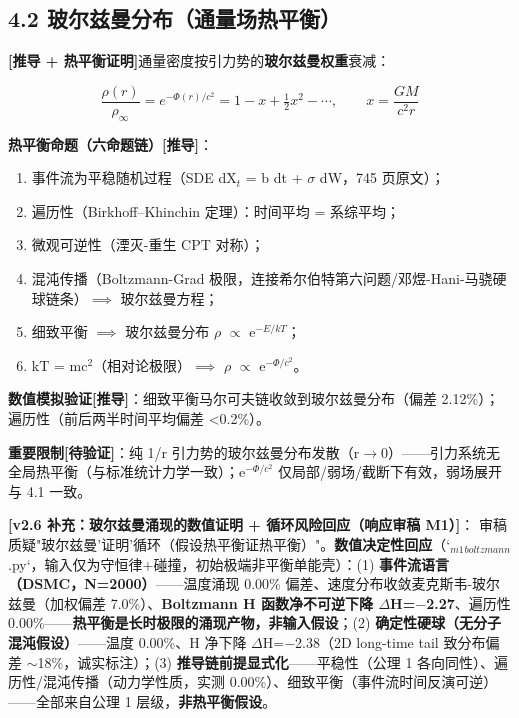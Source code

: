 \documentclass[12pt]{article}
\newcommand{\mtag}[1]{\textbf{[#1]}}
\newcommand{\up}[1]{\ensuremath{^{#1}}}
\newcommand{\down}[1]{\ensuremath{_{#1}}}
\begin{document}
\subsection{4.2 玻尔兹曼分布（通量场热平衡）}

\mtag{推导 + 热平衡证明}通量密度按引力势的\textbf{玻尔兹曼权重}衰减：

\[\frac{\rho(r)}{\rho_\infty} = e^{-\Phi(r)/c^2} = 1 - x + \tfrac12 x^2 - \cdots,\qquad x = \frac{GM}{c^2 r}\]

\textbf{热平衡命题（六命题链）}\mtag{推导}：
\begin{enumerate}
\item 事件流为平稳随机过程（SDE dX\down{t} = b dt + \ensuremath{\sigma} dW，745 页原文）；
\item 遍历性（Birkhoff--Khinchin 定理）：时间平均 = 系综平均；
\item 微观可逆性（湮灭-重生 CPT 对称）；
\item 混沌传播（Boltzmann-Grad 极限，连接希尔伯特第六问题/邓煜-Hani-马骁硬球链条）\ensuremath{\implies} 玻尔兹曼方程；
\item 细致平衡 \ensuremath{\implies} 玻尔兹曼分布 \ensuremath{\rho} \ensuremath{\propto} e\up{-E/kT}；
\item kT = mc\up{2}（相对论极限）\ensuremath{\implies} \ensuremath{\rho} \ensuremath{\propto} e\up{-\Phi{}/c^{2}}。
\end{enumerate}

\textbf{数值模拟验证}\mtag{推导}：细致平衡马尔可夫链收敛到玻尔兹曼分布（偏差 2.12\%）；遍历性（前后两半时间平均偏差 <0.2\%）。

\textbf{重要限制}\mtag{待验证}：纯 1/r 引力势的玻尔兹曼分布发散（r\ensuremath{\to}0）------引力系统无全局热平衡（与标准统计力学一致）；e\up{-\Phi{}/c^{2}} 仅局部/弱场/截断下有效，弱场展开与 4.1 一致。

\textbf{\mtag{v2.6 补充：玻尔兹曼涌现的数值证明 + 循环风险回应（响应审稿 M1）}}：
审稿质疑"玻尔兹曼'证明'循环（假设热平衡证热平衡）"。\textbf{数值决定性回应}（`\down{m1}\down{boltzmann}.py`，输入仅为守恒律+碰撞，初始极端非平衡单能壳）：(1) \textbf{事件流语言（DSMC，N=2000）}------温度涌现 0.00\% 偏差、速度分布收敛麦克斯韦-玻尔兹曼（加权偏差 7.0\%）、\textbf{Boltzmann H 函数净不可逆下降 \ensuremath{\Delta}H=\ensuremath{-}2.27}、遍历性 0.00\%------\textbf{热平衡是长时极限的涌现产物，非输入假设}；(2) \textbf{确定性硬球（无分子混沌假设）}------温度 0.00\%、H 净下降 \ensuremath{\Delta}H=\ensuremath{-}2.38（2D long-time tail 致分布偏差 \ensuremath{\sim}18\%，诚实标注）；(3) \textbf{推导链前提显式化}------平稳性（公理 1 各向同性）、遍历性/混沌传播（动力学性质，实测 0.00\%）、细致平衡（事件流时间反演可逆）------全部来自公理 1 层级，\textbf{非热平衡假设}。
\end{document}
